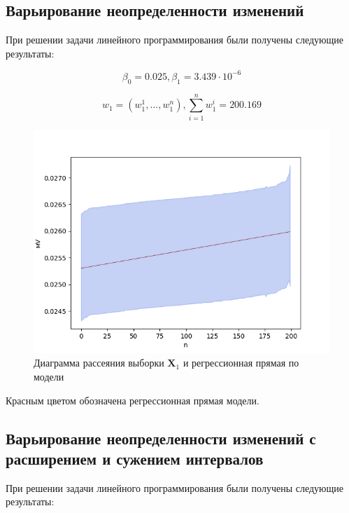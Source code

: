 \subsection{Варьирование неопределенности изменений}

При решении задачи линейного программирования были получены следующие результаты: 

\begin{equation*}
	\beta_0 = 0.025, \beta_1 = 3.439 \cdot 10 ^ {-6} 
\end{equation*}

\begin{equation*}
	w_1 = (w^{1}_1, \ldots, w^{n}_1), \sum\limits_{i=1}^{n} w^{i}_1 = 200.169
\end{equation*}

\begin{figure}[H]
	\begin{center}
		\includegraphics[scale = 0.55]{diagram_and_regress_1.png}
	\end{center}
	\caption{Диаграмма рассеяния выборки $\bm{X}_1$ и регрессионная прямая по модели}
\end{figure}

Красным цветом обозначена регрессионная прямая модели. 

\subsection{Варьирование неопределенности изменений с расширением и сужением интервалов}

При решении задачи линейного программирования были получены следующие результаты: 

